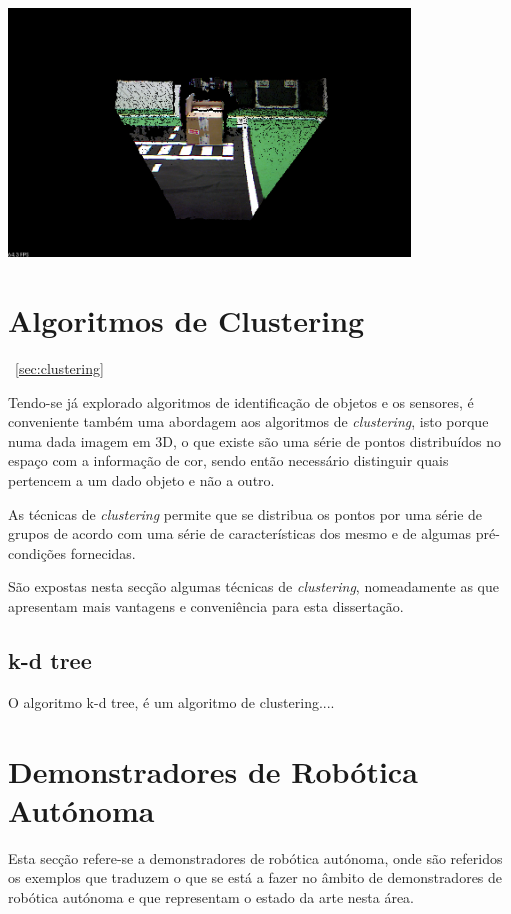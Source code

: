 \begin{center}
	\includegraphics[width=0.80\textwidth]{figures/pcl_color.png}
	\label{fig:pcl_color}
	
\end{center}


\section{Algoritmos de Clustering}~\ref{sec:clustering}

Tendo-se já explorado algoritmos de identificação de objetos e os sensores, é conveniente também uma abordagem aos algoritmos de \emph{clustering}, isto porque numa dada imagem em 3D, o que existe são uma série de pontos distribuídos no espaço com a informação de cor, sendo então necessário distinguir quais pertencem a um dado objeto e não a outro.

As técnicas de \emph{clustering} permite que se distribua os pontos por uma série de grupos de acordo com uma série de características dos mesmo e de algumas pré-condições fornecidas.

São expostas nesta secção algumas técnicas de \emph{clustering}, nomeadamente as que apresentam mais vantagens e conveniência para esta dissertação.

\subsection{k-d tree}

O algoritmo k-d tree, é um algoritmo de clustering....


\section{Demonstradores de Robótica Autónoma}
Esta secção refere-se a demonstradores de robótica autónoma, onde são referidos
os exemplos que traduzem o que se está a fazer no âmbito de demonstradores de
robótica autónoma e que representam o estado da arte nesta área.


